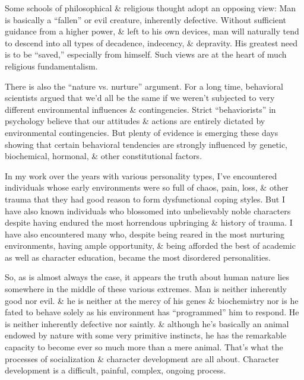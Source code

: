 \documentclass{article}
\numberwithin{equation}{section}
\begin{document}
Some schools of philosophical \& religious thought adopt an opposing view: Man is basically a ``fallen'' or evil creature, inherently defective. Without sufficient guidance from a higher power, \& left to his own devices, man will naturally tend to descend into all types of decadence, indecency, \& depravity. His greatest need is to be ``saved,'' especially from himself. Such views are at the heart of much religious fundamentalism.

There is also the ``nature vs. nurture'' argument. For a long time, behavioral scientists argued that we'd all be the same if we weren't subjected to very different environmental influences \& contingencies. Strict ``behaviorists'' in psychology believe that our attitudes \& actions are entirely dictated by environmental contingencies. But plenty of evidence is emerging these days showing that certain behavioral tendencies are strongly influenced by genetic, biochemical, hormonal, \& other constitutional factors.

In my work over the years with various personality types, I've encountered individuals whose early environments were so full of chaos, pain, loss, \& other trauma that they had good reason to form dysfunctional coping styles. But I have also known individuals who blossomed into unbelievably noble characters despite having endured the most horrendous upbringing \& history of trauma. I have also encountered many who, despite being reared in the most nurturing environments, having ample opportunity, \& being afforded the best of academic as well as character education, became the most disordered personalities.

So, as is almost always the case, it appears the truth about human nature lies somewhere in the middle of these various extremes. Man is neither inherently good nor evil. \& he is neither at the mercy of his genes \& biochemistry nor is he fated to behave solely as his environment has ``programmed'' him to respond. He is neither inherently defective nor saintly. \& although he's basically an animal endowed by nature with some very primitive instincts, he has the remarkable capacity to become ever so much more than a mere animal. That's what the processes of socialization \& character development are all about. Character development is a difficult, painful, complex, ongoing process.
\end{document}
